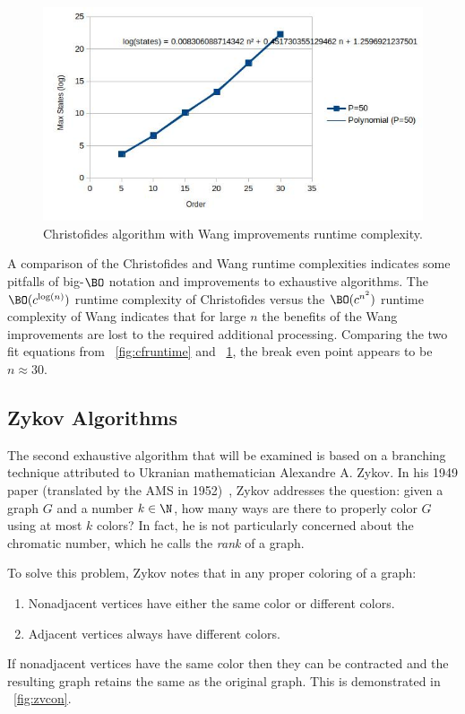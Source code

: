 \begin{figure}[H]
  \centering
  \includegraphics[width=5in]{wang_runtime}
  \caption{Christofides algorithm with Wang improvements runtime complexity.}
  \label{fig:wangruntime}
\end{figure}

A comparison of the Christofides and Wang runtime complexities indicates some pitfalls of big-\(\BO\) notation and
improvements to exhaustive algorithms.  The \(\BO(c^{\log(n)})\) runtime complexity of Christofides versus the
\(\BO(c^{n^2})\) runtime complexity of Wang indicates that for large \(n\) the benefits of the Wang improvements
are lost to the required additional processing.  Comparing the two fit equations from \figurename~\ref{fig:cfruntime}
and \figurename~\ref{fig:wangruntime}, the break even point appears to be \(n\approx30\).

\subsection{Zykov Algorithms}\label{sec:sub:zykov}

The second exhaustive algorithm that will be examined is based on a branching technique attributed to Ukranian
mathematician Alexandre A. Zykov.  In his 1949 paper (translated by the AMS in 1952)~\cite{zykov}, Zykov addresses
the question: given a graph \(G\) and a number \(k\in\N\), how many ways are there to properly color \(G\) using at
most \(k\) colors?  In fact, he is not particularly concerned about the chromatic number, which he calls the
\emph{rank} of a graph.

To solve this problem, Zykov notes that in any proper coloring of a graph:
\begin{enumerate}
\item Nonadjacent vertices have either the same color or different colors.
\item Adjacent vertices always have different colors.
\end{enumerate}
If nonadjacent vertices have the same color then they can be contracted and the resulting graph retains the same
 as the original graph.  This is demonstrated in \figurename~\ref{fig:zvcon}.

